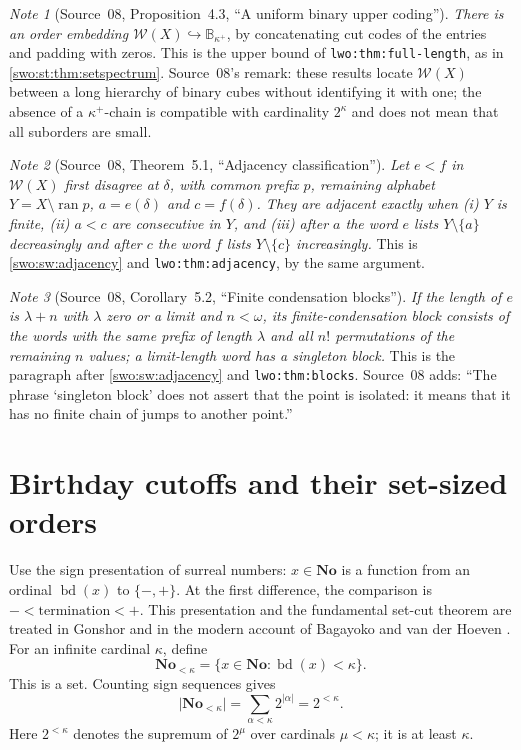 \documentclass[11pt]{article}
\theoremstyle{definition}
\theoremstyle{remark}
\newtheorem{note}[note]{Note}
\newcommand{\No}{\mathbf{No}}
\newcommand{\W}{\mathcal W}
\newcommand{\B}{\mathbb B}
\newcommand{\ran}{\operatorname{ran}}
\newcommand{\bd}{\operatorname{bd}}
\newcommand{\emb}{\hookrightarrow}
\newcommand{\card}[1]{\lvert #1\rvert}
\newcommand{\code}[1]{\texttt{\small #1}}
\begin{document}
\begin{note}[Source~08, Proposition~4.3, ``A uniform binary upper coding'']\label{swo:sk:prop:upperbinary}
\emph{There is an order embedding $\W(X)\emb\B_{\kappa^+}$}, by concatenating
cut codes of the entries and padding with zeros. This is the upper bound of
\code{lwo:thm:full-length}, as in \cref{swo:st:thm:setspectrum}. Source~08's
remark: these results locate $\W(X)$ between a long hierarchy of binary cubes
without identifying it with one; the absence of a $\kappa^+$-chain is
compatible with cardinality $2^\kappa$ and does not mean that all suborders
are small.
\end{note}

\begin{note}[Source~08, Theorem~5.1, ``Adjacency classification'']\label{swo:sk:thm:adjacent}
\emph{Let $e<f$ in $\W(X)$ first disagree at $\delta$, with common prefix $p$,
remaining alphabet $Y=X\setminus\ran p$, $a=e(\delta)$ and $c=f(\delta)$. They
are adjacent exactly when (i) $Y$ is finite, (ii) $a<c$ are consecutive in
$Y$, and (iii) after $a$ the word $e$ lists $Y\setminus\{a\}$ decreasingly
and after $c$ the word $f$ lists $Y\setminus\{c\}$ increasingly.} This is
\cref{swo:sw:adjacency} and \code{lwo:thm:adjacency}, by the same argument.
\end{note}

\begin{note}[Source~08, Corollary~5.2, ``Finite condensation blocks'']\label{swo:sk:cor:finiteblocks}
\emph{If the length of $e$ is $\lambda+n$ with $\lambda$ zero or a limit and
$n<\omega$, its finite-condensation block consists of the words with the same
prefix of length $\lambda$ and all $n!$ permutations of the remaining $n$
values; a limit-length word has a singleton block.} This is the paragraph
after \cref{swo:sw:adjacency} and \code{lwo:thm:blocks}. Source~08 adds:
``The phrase `singleton block' does not assert that the point is isolated: it
means that it has no finite chain of jumps to another point.''
\end{note}

\section{Birthday cutoffs and their set-sized orders}\label{swo:sw:cutoffs}

Use the sign presentation of surreal numbers: \(x\in\No\) is a
function from an ordinal \(\bd(x)\) to \(\{-,+\}\).
At the first difference, the comparison is
\(-<\text{termination}<+\).
This presentation and the fundamental set-cut theorem are treated
in Gonshor and in the modern account of Bagayoko and van der Hoeven
\cite{Gonshor,BagayokoHoeven}.
For an infinite cardinal \(\kappa\), define
\[
                 \No_{<\kappa}
                   =\{x\in\No:\bd(x)<\kappa\}.
\]
This is a set.  Counting sign sequences gives
\[
       \card{\No_{<\kappa}}
          =\sum_{\alpha<\kappa}2^{\card{\alpha}}
          =2^{<\kappa}.
\]
Here \(2^{<\kappa}\) denotes the supremum of \(2^\mu\) over
cardinals \(\mu<\kappa\); it is at least \(\kappa\).
\end{document}
